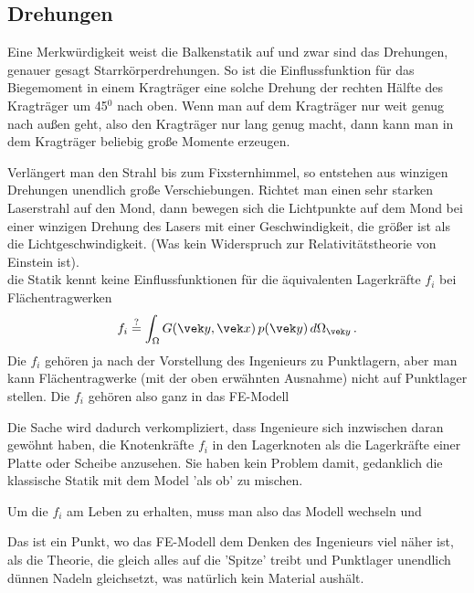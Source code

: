{%
{\textcolor{blau2}{\section{Drehungen}}}
Eine Merkw\"{u}rdigkeit weist die Balkenstatik auf und zwar sind das Drehungen, genauer gesagt Starrk\"{o}rperdrehungen. So ist die Einflussfunktion f\"{u}r das Biegemoment in einem Kragtr\"{a}ger eine solche Drehung der rechten H\"{a}lfte des Kragtr\"{a}ger um 45$^0$ nach oben. Wenn man auf dem Kragtr\"{a}ger nur weit genug nach au{\ss}en geht, also den Kragtr\"{a}ger nur lang genug macht, dann kann man in dem Kragtr\"{a}ger beliebig gro{\ss}e Momente erzeugen.

Verl\"{a}ngert man den Strahl bis zum Fixsternhimmel, so entstehen aus winzigen Drehungen unendlich gro{\ss}e Verschiebungen.
Richtet man einen sehr starken Laserstrahl auf den Mond, dann bewegen sich die Lichtpunkte auf dem Mond bei einer winzigen Drehung des Lasers mit einer Geschwindigkeit, die gr\"{o}{\ss}er ist als die Lichtgeschwindigkeit. (Was kein Widerspruch zur Relativit\"{a}tstheorie von Einstein ist).\\




die Statik kennt keine Einflussfunktionen f\"{u}r die \"{a}quivalenten Lagerkr\"{a}fte $f_i$ bei Fl\"{a}chentragwerken
\begin{align}
f_i \overset{?}{=}  \int_{\Omega} G(\vek y,\vek x)\,p(\vek y)\,d\Omega_{\vek y}\,.
\end{align}
Die $f_i$ geh\"{o}ren ja nach der Vorstellung des Ingenieurs zu Punktlagern, aber man kann Fl\"{a}chentragwerke (mit der oben erw\"{a}hnten Ausnahme) nicht auf Punktlager stellen.
Die $f_i$ geh\"{o}ren also ganz in das FE-Modell

Die Sache wird dadurch verkompliziert, dass Ingenieure sich inzwischen daran gew\"{o}hnt haben, die Knotenkr\"{a}fte $f_i$ in den Lagerknoten als die Lagerkr\"{a}fte einer Platte oder Scheibe anzusehen. Sie haben kein Problem damit, gedanklich die klassische Statik mit dem Model 'als ob' zu mischen.

Um die $f_i$ am Leben zu erhalten, muss man also das Modell wechseln und

Das ist ein Punkt, wo das FE-Modell dem Denken des Ingenieurs viel n\"{a}her ist, als die Theorie, die gleich alles auf die 'Spitze' treibt und Punktlager unendlich d\"{u}nnen Nadeln gleichsetzt, was nat\"{u}rlich kein Material aush\"{a}lt.

}
